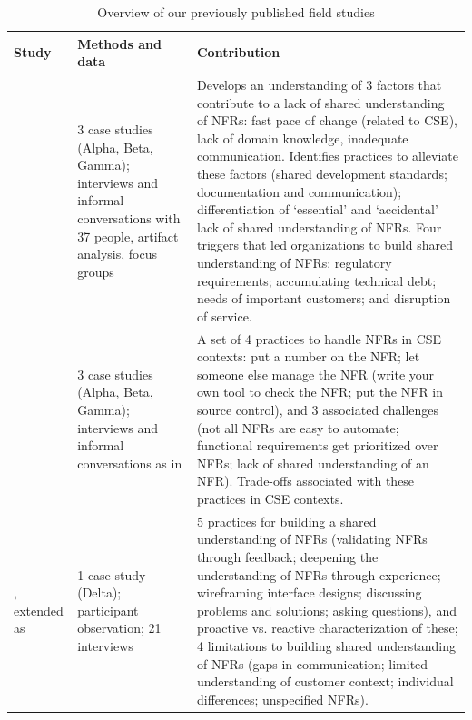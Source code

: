 \documentclass[smallextended]{svjour3}       %
\begin{document}
\begin{table}[!t]
    \caption{Overview of our previously published field studies}
    \label{tab:previous}
    \centering
    \begin{tabular}{P{1.9cm}p{3cm}p{6cm}}
    \toprule 
    Study & Methods and data & Contribution  \\
    \midrule 
    \cite{werner2020re} & 3 case studies (Alpha, Beta, Gamma); interviews and informal conversations with 37 people, artifact analysis, focus groups & Develops an understanding of 3 factors that contribute to a lack of shared understanding of NFRs: fast pace of change (related to CSE), lack of domain knowledge, inadequate communication. Identifies practices to alleviate these factors (shared development standards; documentation and communication); differentiation of `essential' and `accidental' lack of shared understanding of NFRs. Four triggers that led organizations to build shared understanding of NFRs: regulatory requirements; accumulating technical debt; needs of important customers; and disruption of service.  \\
    \addlinespace
    \cite{werner_tse_2021} & 3 case studies (Alpha, Beta, Gamma); interviews and informal conversations as in \cite{werner2020re} & A set of 4 practices to handle NFRs in CSE contexts: put a number on the NFR; let someone else manage the NFR (write your own tool to check the NFR; put the NFR in source control), and 3 associated challenges (not all NFRs are easy to automate; functional requirements get prioritized over NFRs; lack of shared understanding of an NFR). Trade-offs associated with these practices in CSE contexts. \\
    \addlinespace
    \cite{okpara_re2022}, extended as \cite{okpara_rej2023} & 1 case study (Delta); participant observation; 21 interviews & 5 practices for building a shared understanding of NFRs (validating NFRs through feedback; deepening the understanding of NFRs through experience; wireframing interface designs; discussing problems and solutions; asking questions), and proactive vs. reactive characterization of these; 4 limitations to building shared understanding of NFRs (gaps in communication; limited understanding of customer context; individual differences; unspecified NFRs). \\    
    
    \bottomrule 
    \end{tabular}
    
\end{table}
\end{document}
